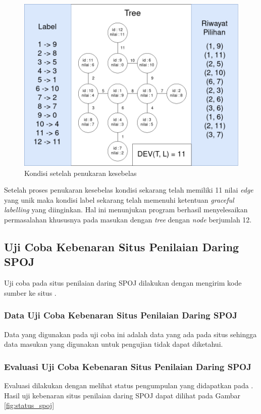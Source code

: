 \begin{figure}[ht]
	\centering\includegraphics[width=1\textwidth]{bab5/figures/uji_coba_12.png}
	\caption{Kondisi setelah penukaran kesebelas}
	\label{fig:uji_coba_12}
\end{figure}

Setelah proses penukaran kesebelas kondisi sekarang telah memiliki 11 nilai \textit{edge} yang unik maka kondisi label sekarang telah memenuhi ketentuan \textit{graceful labelling} yang diinginkan. Hal ini menunjukan program berhasil menyelesaikan permasalahan khususnya pada masukan dengan \textit{tree} dengan \textit{node} berjumlah 12.

\subsection{Uji Coba Kebenaran Situs Penilaian Daring SPOJ}
Uji coba pada situs penilaian daring SPOJ dilakukan dengan mengirim kode sumber ke situs \problem\cite{PT07G}.

\subsubsection{Data Uji Coba Kebenaran Situs Penilaian Daring SPOJ}
Data yang digunakan pada uji coba ini adalah data yang ada pada situs \problem\cite{PT07G} sehingga data masukan yang digunakan untuk pengujian tidak dapat diketahui.

\subsubsection{Evaluasi Uji Coba Kebenaran Situs Penilaian Daring SPOJ}
Evaluasi dilakukan dengan melihat status pengumpulan yang didapatkan pada \problem\cite{PT07G}. Hasil uji kebenaran situs penilaian daring SPOJ dapat dilihat pada Gambar \ref{fig:status_spoj}

